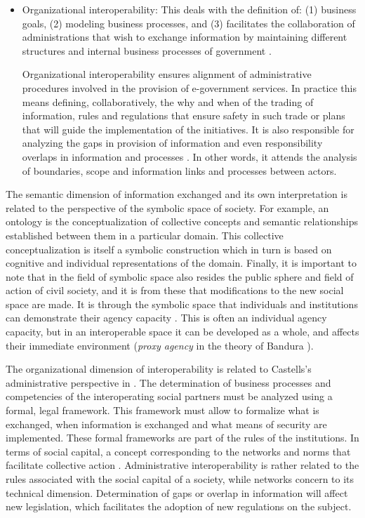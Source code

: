 \documentclass[10pt,twocolumn,ieeetran]{article}
\begin{document}
\begin{itemize}
\item Organizational interoperability: This deals with the definition of: (1) business goals, (2) modeling business processes, and (3) facilitates the collaboration of administrations that wish to exchange information by maintaining different structures and internal business processes of government \cite{Moreno}.

Organizational interoperability ensures alignment of administrative procedures involved in the provision of e-government services. In practice this means  defining, collaboratively, the why and when  of  the trading of information, rules and regulations that ensure safety in such trade or plans that will guide the implementation of the initiatives.
It is also responsible for analyzing the gaps in provision of information and even  responsibility overlaps in information and processes \cite{Moreno}. In other words,  it attends  the analysis of boundaries, scope and information links and processes between actors.
\end{itemize}


The semantic dimension of information exchanged and its own interpretation is related to the perspective of the symbolic space of society. For example, an ontology is the conceptualization of collective concepts and semantic relationships established between them in a particular domain.
This collective conceptualization is itself a symbolic construction which in turn is based on cognitive and individual representations of the domain. Finally, it is important to note that in the field of symbolic space also resides the public sphere and field of action of civil society, and it is from these that modifications to the new social space are made.
It is through the symbolic space that individuals and institutions can demonstrate their agency capacity  \cite{Bandura}. This is often an individual agency capacity, but in an interoperable space  it can be developed as a whole, and affects their immediate environment ({\it proxy agency} in the theory of Bandura \cite{Bandura}).


The organizational dimension of interoperability is related to Castells's administrative perspective in \cite{Castells2}. The determination of business processes and competencies of the interoperating social partners must be analyzed using a formal, legal framework. This framework must  allow to formalize what is exchanged, when information is exchanged and what means of security are implemented. These formal frameworks are part of the rules of the institutions. In terms of social capital, a concept corresponding to the networks and norms that facilitate collective action \cite{Woolcock} \cite{Uphoff} \cite{Dahal} \cite{Sobel} \cite{Maseda}. Administrative interoperability is rather related  to the rules associated with the social capital of a society, while networks concern to its technical dimension. Determination of gaps or overlap in information will affect new legislation, which facilitates the adoption of new regulations on the subject.
\end{document}
